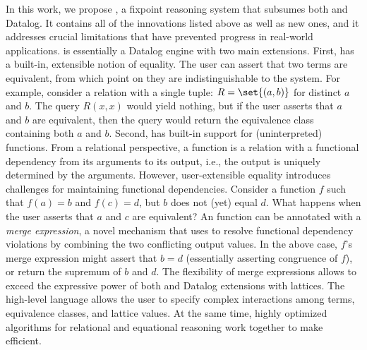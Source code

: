 In this work,
 we propose \egglog,
 a fixpoint reasoning system that subsumes both \eqsat and Datalog.
It contains all of the innovations listed above as well as new ones,
 and it addresses crucial limitations that have prevented progress in 
 real-world applications.
\egglog is essentially a Datalog engine
 with two main extensions. %
First,
 \egglog has a built-in, extensible notion of equality.
The user can assert that two terms are equivalent,
 from which point on they are indistinguishable to the system.
For example,
 consider a relation with a single tuple: $R = \set{(a, b)}$
 for distinct $a$ and $b$.
The query $R(x, x)$ would yield nothing,
 but if the user asserts that $a$ and $b$ are equivalent,
 then the query would return the equivalence class containing both $a$ and $b$.
Second,
 \egglog has built-in support for (uninterpreted) functions.
From a relational perspective,
 a function is a relation with a functional dependency 
 from its arguments to its output,
 i.e., the output is uniquely determined by the arguments.
However, user-extensible equality
 introduces challenges for maintaining functional dependencies.
Consider a function $f$ such that $f(a) = b$ and $f(c) = d$, 
 but $b$ does not (yet) equal $d$.
What happens when the user asserts that $a$ and $c$ are equivalent?
An \egglog function can be annotated with a \emph{merge expression},
 a novel mechanism that 
 \egglog uses to resolve functional dependency violations
 by combining the two conflicting output values.
In the above case,
 $f$'s merge expression might 
 assert that $b = d$ (essentially asserting congruence of $f$),
 or return the supremum of $b$ and $d$.
The flexibility of merge expressions allows \egglog
 to exceed the expressive power of both \eqsat and 
 Datalog extensions with lattices.
The high-level \Egglog language allows the user to specify 
  complex interactions among terms, equivalence classes, 
  and lattice values.
At the same time, highly optimized algorithms for 
  relational and equational reasoning 
  work together to make \Egglog efficient.

